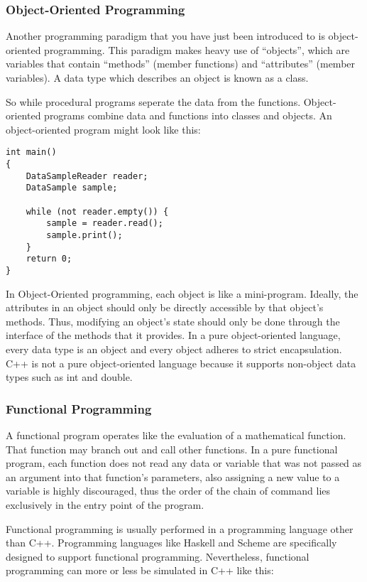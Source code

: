 \documentclass[a4paper,12pt]{article}
\begin{document}
\subsubsection*{Object-Oriented Programming}

Another programming paradigm that you have just been introduced to is object-oriented programming. This paradigm makes heavy use of ``objects'', which are variables that contain ``methods'' (member functions) and ``attributes'' (member variables). A data type which describes an object is known as a class.

So while procedural programs seperate the data from the functions. Object-oriented programs combine data and functions into classes and objects. An object-oriented program might look like this:

\begin{lstlisting}
int main()
{
	DataSampleReader reader;
	DataSample sample;

	while (not reader.empty()) {
		sample = reader.read();
		sample.print();
	}
	return 0;
}
\end{lstlisting}

In Object-Oriented programming, each object is like a mini-program. Ideally, the attributes in an object should only be directly accessible by that object's methods. Thus, modifying an object's state should only be done through the interface of the methods that it provides. In a pure object-oriented language, every data type is an object and every object adheres to strict encapsulation. C++ is not a pure object-oriented language because it supports non-object data types such as int and double.

\subsubsection*{Functional Programming}

A functional program operates like the evaluation of a mathematical function. That function may branch out and call other functions. In a pure functional program, each function does not read any data or variable that was not passed as an argument into that function's parameters, also assigning a new value to a variable is highly discouraged, thus the order of the chain of command lies exclusively in the entry point of the program.

Functional programming is usually performed in a programming language other than C++. Programming languages like Haskell and Scheme are specifically designed to support functional programming. Nevertheless, functional programming can more or less be simulated in C++ like this:
\end{document}
